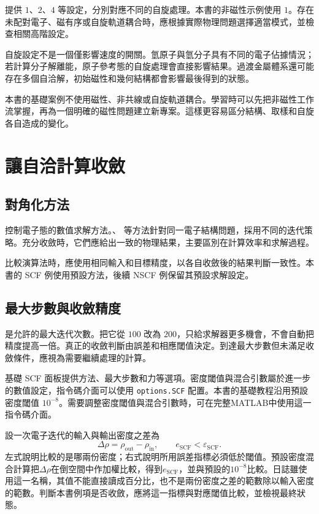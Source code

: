  提供 $1$、$2$、$4$ 等設定，分別對應不同的自旋處理。本書的非磁性示例使用 $1$。存在未配對電子、磁有序或自旋軌道耦合時，應根據實際物理問題選擇適當模式，並檢查相關高階設定。

自旋設定不是一個僅影響速度的開關。氫原子與氫分子具有不同的電子佔據情況；若計算分子解離能，原子參考態的自旋處理會直接影響結果。過渡金屬體系還可能存在多個自洽解，初始磁性和幾何結構都會影響最後得到的狀態。

本書的基礎案例不使用磁性、非共線或自旋軌道耦合。學習時可以先把非磁性工作流掌握，再為一個明確的磁性問題建立新專案。這樣更容易區分結構、取樣和自旋各自造成的變化。

\section{讓自洽計算收斂}

\subsection{對角化方法}

 控制電子態的數值求解方法。、 等方法針對同一電子結構問題，採用不同的迭代策略。充分收斂時，它們應給出一致的物理結果，主要區別在計算效率和求解過程。

比較演算法時，應使用相同輸入和目標精度，以各自收斂後的結果判斷一致性。本書的 SCF 例使用預設方法，後續 NSCF 例保留其預設求解設定。

\subsection{最大步數與收斂精度}

 是允許的最大迭代次數。把它從 $100$ 改為 $200$，只給求解器更多機會，不會自動把精度提高一倍。真正的收斂判斷由誤差和相應閾值決定。到達最大步數但未滿足收斂條件，應視為需要繼續處理的計算。

基礎 SCF 面板提供方法、最大步數和力等選項。密度閾值與混合引數屬於進一步的數值設定，指令碼介面可以使用 \texttt{options.SCF} 配置。本書的基礎教程沿用預設密度閾值 $10^{-8}$。需要調整密度閾值與混合引數時，可在完整MATLAB\regmark{}中使用這一指令碼介面。


設一次電子迭代的輸入與輸出密度之差為
\begin{equation}
  \Delta\rho=\rho_{\mathrm{out}}-\rho_{\mathrm{in}},
  \qquad e_{\mathrm{SCF}}<\varepsilon_{\mathrm{SCF}}.
  \label{eq:scf-stopping}
\end{equation}
左式說明比較的是哪兩份密度；右式說明所用誤差指標必須低於閾值。預設密度混合計算把$\Delta\rho$在倒空間中作加權比較，得到$e_{\mathrm{SCF}}$，並與預設的$10^{-8}$比較。日誌雖使用這一名稱，其值不能直接讀成百分比，也不是兩份密度之差的範數除以輸入密度的範數。判斷本書例項是否收斂，應將這一指標與對應閾值比較，並檢視最終狀態。

